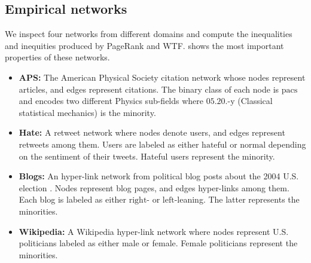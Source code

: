 \documentclass[fleqn,10pt]{wlscirep}
\begin{document}
\subsection*{Empirical networks}
 We inspect four networks from different domains and compute the inequalities and inequities produced by PageRank and WTF.  shows the most important properties of these networks.
\begin{itemize}
    \item \textbf{APS:} The American Physical Society citation network whose nodes represent articles, and edges represent citations. The binary class of each node is $\text{pacs}$ and encodes two different Physics sub-fields where $\text{05.20.-y}$ (Classical statistical mechanics) is the minority.

    \item \textbf{Hate:} A retweet network \cite{kaggle:hate} where nodes denote users, and edges represent retweets among them. Users are labeled as either $\text{hateful}$ or $\text{normal}$ depending on the sentiment of their tweets. Hateful users represent the minority.
    
    \item \textbf{Blogs:} An hyper-link network from political blog posts about the 2004 U.S. election \cite{adamic2005political}. Nodes represent blog pages, and edges hyper-links among them. Each blog is labeled as either $\text{right-}$ or $\text{left-}$leaning. The latter represents the minorities.

    \item \textbf{Wikipedia:} A Wikipedia hyper-link network where nodes represent U.S. politicians \cite{wikiwag, wiki:poli} labeled as either male or female. Female politicians represent the minorities. 
\end{itemize}
\end{document}
